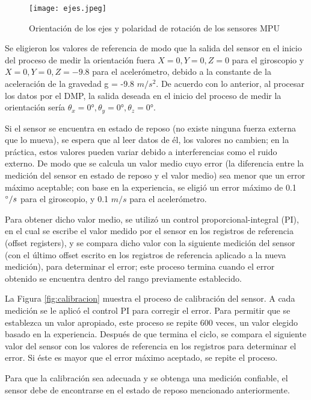 \begin{figure}[htb]
	\centering
	\texttt{[image: ejes.jpeg]}
	\caption{Orientación de los ejes y polaridad de rotación de los sensores MPU}
	\label{fig:ejes}
\end{figure}

Se eligieron los valores de referencia de modo que la salida del sensor en el inicio del proceso de medir la orientación fuera $X=0, Y=0, Z=0$ para el giroscopio y $X=0, Y=0, Z=-9.8$ para el acelerómetro, debido a la constante de la aceleración de la gravedad g = -9.8  $m/s^2$. De acuerdo con lo anterior, al procesar los datos por el DMP, la salida deseada en el inicio del proceso de medir la orientación sería $\theta_x = 0°,\theta_y = 0°,\theta_z = 0°$.

Si el sensor se encuentra en estado de reposo (no existe ninguna fuerza externa que lo mueva), se espera que al leer datos de él, los valores no cambien; en la práctica, estos valores pueden variar debido a interferencias como el ruido externo. De modo que se calcula un valor medio cuyo error (la diferencia entre la medición del sensor en estado de reposo y el valor medio) sea menor que un error máximo aceptable; con base en la experiencia, se eligió un error máximo de 0.1 $\degree/s$ para el giroscopio, y 0.1 $m/s$ para el acelerómetro.

Para obtener dicho valor medio, se utilizó un control proporcional-integral (PI), en el cual se escribe el valor medido por el sensor en los registros de referencia (offset registers), y se compara dicho valor con la siguiente medición del sensor (con el último offset escrito en los registros de referencia aplicado a la nueva medición), para determinar el error; este proceso termina cuando el error obtenido se encuentra dentro del rango previamente establecido.

La Figura \ref{fig:calibracion} muestra el proceso de calibración del sensor. A cada medición se le aplicó el control PI para corregir el error. Para permitir que se establezca un valor apropiado, este proceso se repite 600 veces, un valor elegido basado en la experiencia. Después de que termina el ciclo, se compara el siguiente valor del sensor con los valores de referencia en los registros para determinar el error. Si éste es mayor que el error máximo aceptado, se repite el proceso.

Para que la calibración sea adecuada y se obtenga una medición confiable, el sensor debe de encontrarse en el estado de reposo mencionado anteriormente.

